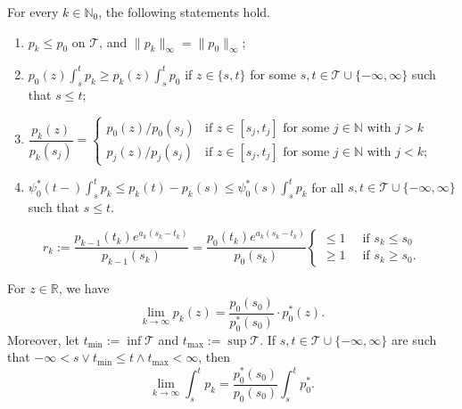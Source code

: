 \documentclass[10pt,a4paper]{amsart}
\newcommand{\N}{\mathbb{N}}
\newcommand{\R}{\mathbb{R}}
\newcommand{\norm}[1]{\|{#1}\|}
\begin{document}
\begin{lemma}
\label{lem:pk-induction}
For every $k \in \N_0$, the following statements hold.
\begin{enumerate}[label=(\alph*)]
\item $p_k \leq p_0$ on $\mathcal{T}$, and $\norm{p_k}_\infty = \norm{p_0}_\infty$;
\item $\displaystyle p_0(z) \int_s^t p_k \geq p_k(z) \int_s^t p_0$ if $z \in \{s,t\}$ for some $s,t \in \mathcal{T} \cup \{-\infty,\infty\}$ such that $s \leq t$;
\item $\dfrac{p_k(z)}{p_k(s_j)} = 
\begin{cases}
p_0(z)/p_0(s_j) &\text{if }z \in [s_j,t_j]\text{ for some }j \in \N\text{ with }j > k \\
p_j(z)/p_j(s_j) &\text{if }z \in [s_j,t_j]\text{ for some }j \in \N\text{ with }j < k;
\end{cases}$
\item $\displaystyle \psi_0^*(t-) \int_s^t p_k \leq p_k(t) - p_k(s) \leq \psi_0^*(s)\int_s^t p_k$ for all $s,t \in \mathcal{T} \cup \{-\infty,\infty\}$ such that $s \leq t$.
\end{enumerate}
\end{lemma}

\begin{equation}
\label{eq:rk}
r_k := \frac{p_{k-1}(t_k)e^{a_k(s_k - t_k)}}{p_{k-1}(s_k)} = \frac{p_0(t_k)e^{a_k(s_k - t_k)}}{p_0(s_k)}
\begin{cases}
\leq 1 \;\;&\text{if }s_k \leq s_0 \\
\geq 1 \;\;&\text{if }s_k \geq s_0.
\end{cases}
\end{equation}

\begin{lemma}
\label{lem:pk-limit}
For $z \in \R$, we have
\begin{equation}
\label{eq:pk-limit}
\lim_{k \to \infty}p_k(z) = \frac{p_0(s_0)}{p_0^*(s_0)} \cdot p_0^*(z).
\end{equation}
Moreover, let $t_{\min} := \inf\mathcal{T}$ and $t_{\max} := \sup\mathcal{T}$. If $s,t \in \mathcal{T} \cup \{-\infty,\infty\}$ are such that $-\infty < s \vee t_{\min} \leq t \wedge t_{\max} < \infty$, then
\begin{equation}
\label{eq:pk-int-limit}
\lim_{k \to \infty}\int_s^t p_k = \frac{p_0^*(s_0)}{p_0(s_0)} \int_s^t p_0^*.
\end{equation}
\end{lemma}
\end{document}
